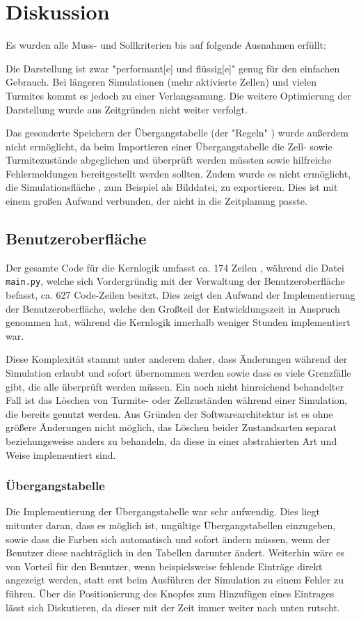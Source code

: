 \section{Diskussion}
Es wurden alle Muss- und Sollkriterien bis auf folgende Ausnahmen erfüllt:

Die Darstellung \cite[1.2.1]{pflichtenheft} ist zwar "performant[e] und flüssig[e]" genug für den einfachen Gebrauch. Bei längeren Simulationen (mehr aktivierte Zellen) und vielen Turmites kommt es jedoch zu einer Verlangsamung. Die weitere Optimierung der Darstellung wurde aus Zeitgründen nicht weiter verfolgt.

Das gesonderte Speichern der Übergangstabelle (der "Regeln" \cite[1.1.6]{pflichtenheft}) wurde außerdem nicht ermöglicht, da beim Importieren einer Übergangstabelle die Zell- sowie Turmitezustände abgeglichen und überprüft werden müssten sowie hilfreiche Fehlermeldungen bereitgestellt werden sollten. Zudem wurde es nicht ermöglicht, die Simulationsfläche \cite[1.1.6]{pflichtenheft}, zum Beispiel als Bilddatei, zu exportieren. Dies ist mit einem großen Aufwand verbunden, der nicht in die Zeitplanung passte.

\subsection{Benutzeroberfläche}
Der gesamte Code für die Kernlogik umfasst ca. 174 Zeilen \cite{cloc}, während die Datei \texttt{main.py}, welche sich Vordergründig mit der Verwaltung der Benutzeroberfläche befasst, ca. 627 Code-Zeilen \cite{cloc} besitzt. Dies zeigt den Aufwand der Implementierung der Benutzeroberfläche, welche den Großteil der Entwicklungszeit in Anspruch genommen hat, während die Kernlogik innerhalb weniger Stunden implementiert war.

Diese Komplexität stammt unter anderem daher, dass Änderungen während der Simulation erlaubt und sofort übernommen werden sowie dass es viele Grenzfälle gibt, die alle überprüft werden müssen. Ein noch nicht hinreichend behandelter Fall ist das Löschen von Turmite- oder Zellzuständen während einer Simulation, die bereits genutzt werden. Aus Gründen der Softwarearchitektur ist es ohne größere Änderungen nicht möglich, das Löschen beider Zustandsarten separat beziehungsweise anders zu behandeln, da diese in einer abstrahierten Art und Weise implementiert sind.

\subsubsection{Übergangstabelle}
Die Implementierung der Übergangstabelle war sehr aufwendig. Dies liegt mitunter daran, dass es möglich ist, ungültige Übergangstabellen einzugeben, sowie dass die Farben sich automatisch und sofort ändern müssen, wenn der Benutzer diese nachträglich in den Tabellen darunter ändert. Weiterhin wäre es von Vorteil für den Benutzer, wenn beispielsweise fehlende Einträge direkt angezeigt werden, statt erst beim Ausführen der Simulation zu einem Fehler zu führen. Über die Positionierung des Knopfes zum Hinzufügen eines Eintrages lässt sich Diskutieren, da dieser mit der Zeit immer weiter nach unten rutscht.

